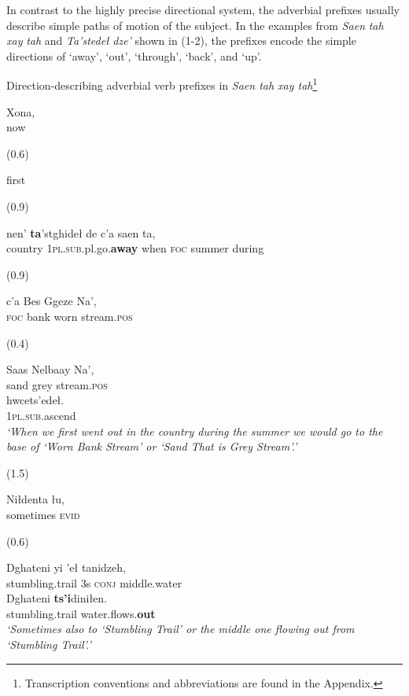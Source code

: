In contrast to the highly precise directional system, the adverbial prefixes usually describe simple paths of motion of the subject. In the examples from \textit{Saen} \textit{tah} \textit{xay} \textit{tah} and \textit{Ta’stedeł} \textit{dze’} shown in (1-2), the prefixes encode the simple directions of ‘away’, ‘out’, ‘through’, ‘back’, and ‘up’.

\begin{exe}
  \ex   Direction-describing adverbial verb prefixes in \textit{Saen tah xay tah}\footnote{Transcription conventions and abbreviations are found in the Appendix.}\label{berez-ex1}
\begin{xlistn}
 \gll Xona,\\
    now\\
\sn \begin{flushright} (0.6) \end{flushright}
  first
\begin{flushright} (0.9) \end{flushright}
 \gll   nen’ \textbf{ta}’stghideł de c’a saen ta, \\
    country   1\textsc{pl.sub}.pl.go.\textbf{away}  when  \textsc{foc}    summer  during\\
\sn \begin{flushright} (0.9) \end{flushright}

 \gll c’a  Bes Ggeze Na’, \\
    \textsc{foc}  bank   worn     stream.\textsc{pos}\\
\sn \begin{flushright} (0.4) \end{flushright}
 \gll  Saas Nelbaay Na’,\\
    sand  grey      stream.\textsc{pos}\\
 \gll hwcets’edeł. \\
    1\textsc{pl.sub}.ascend\\

\glt \textit{‘When we first went out in the country during the summer we would go to the base of ‘Worn Bank Stream’ or ‘Sand That is Grey Stream’.’}
\sn \begin{flushright} (1.5) \end{flushright}
 \gll       Niłdenta łu,\\
    sometimes  \textsc{evid}\\
\sn \begin{flushright} (0.6) \end{flushright}
 \gll  Dghateni    yi ’eł tanidzeh,\\
    stumbling.trail  3s  \textsc{conj}   middle.water\\
 \gll      Dghateni \textbf{ts’i}diniłen.\\
    stumbling.trail  water.flows.\textbf{out}\\
\glt \textit{‘Sometimes also to ‘Stumbling Trail’ or the middle one flowing out from ‘Stumbling Trail’.’}


\end{xlistn}
\end{exe}
